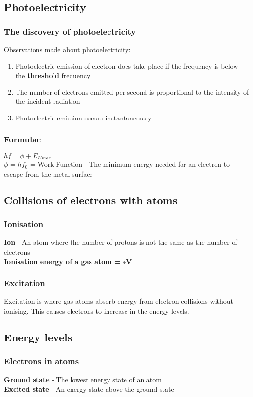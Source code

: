 \documentclass{article}[18pt]
\begin{document}
\subsection{Photoelectricity}
\subsubsection{The discovery of photoelectricity}
Observations made about photoelectricity:
\begin{enumerate}
\item Photoelectric emission of electron does take place if the frequency is below the \textbf{threshold} frequency
\item The number of electrons emitted per second is proportional to the intensity of the incident radiation
\item Photoelectric emission occurs instantaneously 
\end{enumerate}
\subsubsection{Formulae}
$hf=\phi+E_{Kmax}$\\
$\phi$ = $hf_0$ = Work Function - The minimum energy needed for an electron to escape from the metal surface\\
\subsection{Collisions of electrons with atoms}
\subsubsection{Ionisation}
\textbf{Ion} - An atom where the number of protons is not the same as the number of electrons\\
\textbf{Ionisation energy of a gas atom = eV}
\subsubsection{Excitation}
Excitation is where gas atoms absorb energy from electron collisions without ionising. This causes electrons to increase in the energy levels.
\subsection{Energy levels}
\subsubsection{Electrons in atoms}
\textbf{Ground state} - The lowest energy state of an atom\\
\textbf{Excited state} - An energy state above the ground state
\end{document}
